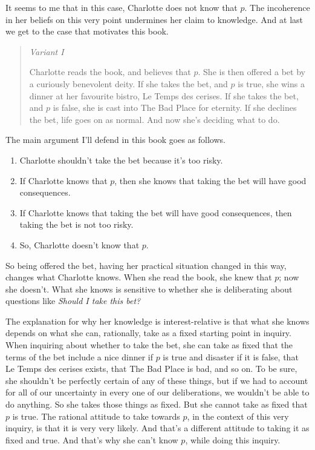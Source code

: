 \documentclass[11pt,]{book}
\providecommand{\tightlist}{%
  \setlength{\itemsep}{0pt}\setlength{\parskip}{0pt}}
\begin{document}
It seems to me that in this case, Charlotte does not know that \(p\). The incoherence in her beliefs on this very point undermines her claim to knowledge. And at last we get to the case that motivates this book.

\begin{quote}
\emph{Variant I}

Charlotte reads the book, and believes that \(p\). She is then offered a bet by a curiously benevolent deity. If she takes the bet, and \(p\) is true, she wins a dinner at her favourite bistro, Le Temps des cerises. If she takes the bet, and \(p\) is false, she is cast into The Bad Place for eternity. If she declines the bet, life goes on as normal. And now she's deciding what to do.
\end{quote}

The main argument I'll defend in this book goes as follows.

\begin{enumerate}
\def\labelenumi{\arabic{enumi}.}
\tightlist
\item
  Charlotte shouldn't take the bet because it's too risky.
\item
  If Charlotte knows that \(p\), then she knows that taking the bet will have good consequences.
\item
  If Charlotte knows that taking the bet will have good consequences, then taking the bet is not too risky.
\item
  So, Charlotte doesn't know that \(p\).
\end{enumerate}

So being offered the bet, having her practical situation changed in this way, changes what Charlotte knows. When she read the book, she knew that \(p\); now she doesn't. What she knows is sensitive to whether she is deliberating about questions like \emph{Should I take this bet?}

The explanation for why her knowledge is interest-relative is that what she knows depends on what she can, rationally, take as a fixed starting point in inquiry. When inquiring about whether to take the bet, she can take as fixed that the terms of the bet include a nice dinner if \(p\) is true and disaster if it is false, that Le Temps des cerises exists, that The Bad Place is bad, and so on. To be sure, she shouldn't be perfectly certain of any of these things, but if we had to account for all of our uncertainty in every one of our deliberations, we wouldn't be able to do anything. So she takes those things as fixed. But she cannot take as fixed that \(p\) is true. The rational attitude to take towards \(p\), in the context of this very inquiry, is that it is very very likely. And that's a different attitude to taking it as fixed and true. And that's why she can't know \(p\), while doing this inquiry.
\end{document}
